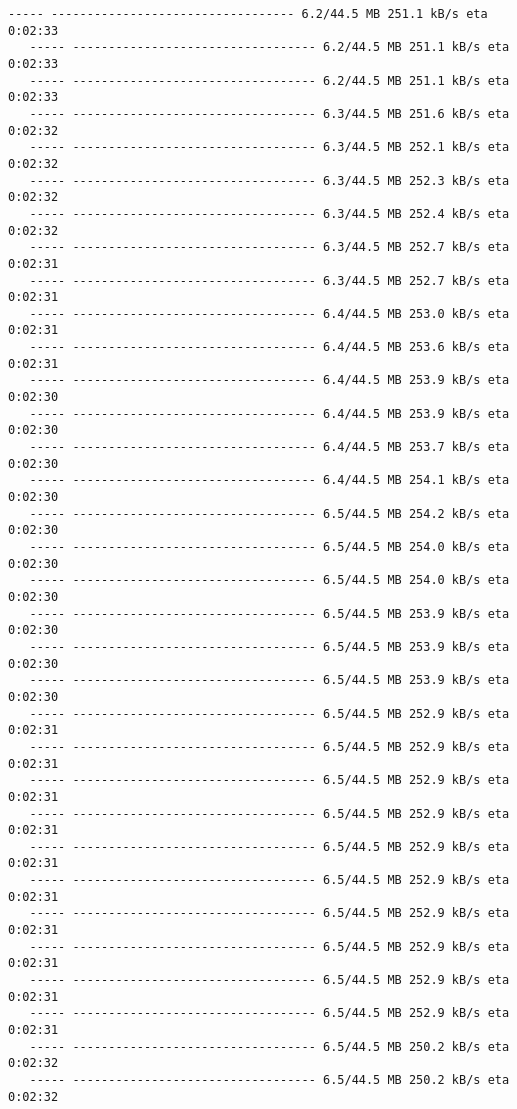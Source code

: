 \documentclass[11pt]{article}
\begin{document}
\begin{Verbatim}[commandchars=\\\{\}]
   ----- ---------------------------------- 6.2/44.5 MB 251.1 kB/s eta 0:02:33
   ----- ---------------------------------- 6.2/44.5 MB 251.1 kB/s eta 0:02:33
   ----- ---------------------------------- 6.2/44.5 MB 251.1 kB/s eta 0:02:33
   ----- ---------------------------------- 6.3/44.5 MB 251.6 kB/s eta 0:02:32
   ----- ---------------------------------- 6.3/44.5 MB 252.1 kB/s eta 0:02:32
   ----- ---------------------------------- 6.3/44.5 MB 252.3 kB/s eta 0:02:32
   ----- ---------------------------------- 6.3/44.5 MB 252.4 kB/s eta 0:02:32
   ----- ---------------------------------- 6.3/44.5 MB 252.7 kB/s eta 0:02:31
   ----- ---------------------------------- 6.3/44.5 MB 252.7 kB/s eta 0:02:31
   ----- ---------------------------------- 6.4/44.5 MB 253.0 kB/s eta 0:02:31
   ----- ---------------------------------- 6.4/44.5 MB 253.6 kB/s eta 0:02:31
   ----- ---------------------------------- 6.4/44.5 MB 253.9 kB/s eta 0:02:30
   ----- ---------------------------------- 6.4/44.5 MB 253.9 kB/s eta 0:02:30
   ----- ---------------------------------- 6.4/44.5 MB 253.7 kB/s eta 0:02:30
   ----- ---------------------------------- 6.4/44.5 MB 254.1 kB/s eta 0:02:30
   ----- ---------------------------------- 6.5/44.5 MB 254.2 kB/s eta 0:02:30
   ----- ---------------------------------- 6.5/44.5 MB 254.0 kB/s eta 0:02:30
   ----- ---------------------------------- 6.5/44.5 MB 254.0 kB/s eta 0:02:30
   ----- ---------------------------------- 6.5/44.5 MB 253.9 kB/s eta 0:02:30
   ----- ---------------------------------- 6.5/44.5 MB 253.9 kB/s eta 0:02:30
   ----- ---------------------------------- 6.5/44.5 MB 253.9 kB/s eta 0:02:30
   ----- ---------------------------------- 6.5/44.5 MB 252.9 kB/s eta 0:02:31
   ----- ---------------------------------- 6.5/44.5 MB 252.9 kB/s eta 0:02:31
   ----- ---------------------------------- 6.5/44.5 MB 252.9 kB/s eta 0:02:31
   ----- ---------------------------------- 6.5/44.5 MB 252.9 kB/s eta 0:02:31
   ----- ---------------------------------- 6.5/44.5 MB 252.9 kB/s eta 0:02:31
   ----- ---------------------------------- 6.5/44.5 MB 252.9 kB/s eta 0:02:31
   ----- ---------------------------------- 6.5/44.5 MB 252.9 kB/s eta 0:02:31
   ----- ---------------------------------- 6.5/44.5 MB 252.9 kB/s eta 0:02:31
   ----- ---------------------------------- 6.5/44.5 MB 252.9 kB/s eta 0:02:31
   ----- ---------------------------------- 6.5/44.5 MB 252.9 kB/s eta 0:02:31
   ----- ---------------------------------- 6.5/44.5 MB 250.2 kB/s eta 0:02:32
   ----- ---------------------------------- 6.5/44.5 MB 250.2 kB/s eta 0:02:32

\end{Verbatim}
\end{document}
